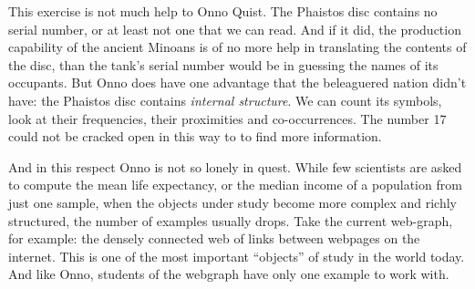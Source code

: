 This exercise is not much help to Onno Quist. The Phaistos disc contains no serial number, or at least not one that we can read. And if it did, the production capability of the ancient Minoans is of no more help in translating the contents of the disc, than the tank's serial number would be in guessing the names of its occupants. But Onno does have one advantage that the beleaguered nation didn't have: the Phaistos disc contains \emph{internal structure}. We can count its symbols, look at their frequencies, their proximities and co-occurrences. The number 17 could not be cracked open in this way to to find more information.

And in this respect Onno is not so lonely in quest. While few scientists are asked to compute the mean life expectancy, or the median income of a population from just one sample, when the objects under study become more complex and richly structured, the number of examples usually drops. Take the current web-graph, for example: the densely connected web of links between webpages on the internet. This is one of the most important ``objects'' of study in the world today. And like Onno, students of the webgraph have only one example to work with. 



